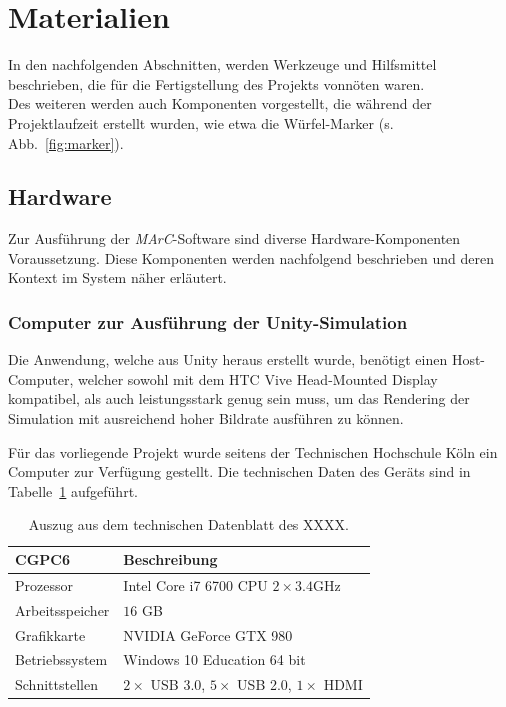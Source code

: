 \section{Materialien}\label{sec:Materialien}
In den nachfolgenden Abschnitten, werden Werkzeuge und Hilfsmittel beschrieben, die für die Fertigstellung des Projekts vonnöten waren.\\ Des weiteren werden auch Komponenten vorgestellt, die während der Projektlaufzeit erstellt wurden, wie etwa die Würfel-Marker (s. Abb.~\ref{fig:marker}).

\subsection{Hardware}
Zur Ausführung der \emph{MArC}-Software sind diverse Hardware-Komponenten Voraussetzung. Diese Komponenten werden nachfolgend beschrieben und deren Kontext im System näher erläutert.
\subsubsection{Computer zur Ausführung der Unity-Simulation}\label{sec:UnityComp}
Die Anwendung, welche aus Unity \cite{website:Unity} heraus erstellt wurde, benötigt einen Host-Computer, welcher sowohl mit dem HTC Vive Head-Mounted Display kompatibel, als auch leistungsstark genug sein muss, um das Rendering der Simulation mit ausreichend hoher Bildrate ausführen zu können.

Für das vorliegende Projekt wurde seitens der Technischen Hochschule Köln ein Computer zur Verfügung gestellt. Die technischen Daten des Geräts sind in Tabelle~\ref{tab:UnityCompParam} aufgeführt.


\begin{table}
	\centering
	\begin{tabular}{|l|l|}
		\hline
		\Absatzbox{}
		\textbf{CGPC6}& \textbf{Beschreibung} \\
		\hline
		Prozessor & Intel Core i7 6700 CPU \@ $2 \times 3.4$GHz \\
		\hline
		Arbeitsspeicher & $16$ GB \\
 		\hline 
		Grafikkarte & NVIDIA GeForce GTX 980\\
		\hline
		Betriebssystem & Windows 10 Education 64 bit \\
		\hline
		Schnittstellen & $2\times$ USB 3.0, $5 \times$ USB 2.0, $1 \times $ HDMI \\
		\hline
	\end{tabular}
	\caption{Auszug aus dem technischen Datenblatt des XXXX.}
	\label{tab:UnityCompParam}
\end{table}

